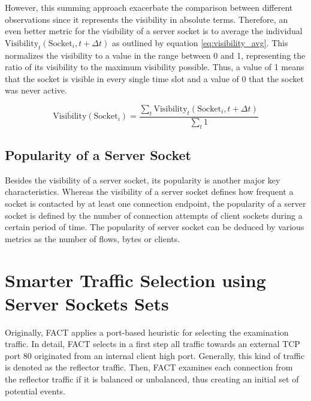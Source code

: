 However, this summing approach exacerbate the comparison between different
observations since it represents the visibility in absolute terms. Therefore, an
even better metric for the visibility of a \gls{server socket} is to average the
individual $\text{Visibility}_t(\text{Socket}_i,t+\Delta{t})$ as outlined by
equation \ref{eq:visibility_avg}. This normalizes the visibility to a value in
the range between 0 and 1, representing the ratio of its visibility to the
maximum visibility possible. Thus, a value of 1 means that the socket is visible
in every single time slot and a value of 0 that the socket was never active.

\begin{equation}
	\overline{\text{Visibility}}(\text{Socket}_i) = \frac{\sum_{t} \text{Visibility}_t(\text{Socket}_i,t+\Delta{t})}{\sum_{t}1}
	\label{eq:visibility_avg}
\end{equation}

\subsection{Popularity of a Server Socket}

Besides the visibility of a \gls{server socket}, its popularity is another major
key characteristics. Whereas the visibility of a \gls{server socket} defines how
frequent a socket is contacted by at least one connection endpoint, the
popularity of a \gls{server socket} is defined by the number of connection
attempts of client sockets during a certain period of time. The popularity of
\gls{server socket} can be deduced by various metrics as the number of flows,
bytes or clients.

\section{Smarter Traffic Selection using Server Sockets Sets 
\label{section:ses_traffic_selection}}

Originally, \gls{FACT} applies a port-based heuristic for selecting the 
examination traffic. 
In detail, \gls{FACT} selects in a first step all traffic towards an external 
\gls{TCP} port 80 originated from an internal client high port. 
Generally, this kind of traffic is denoted as the reflector traffic. 
Then, \gls{FACT} examines each connection from the reflector traffic if it is 
balanced or unbalanced, thus creating an initial set of potential events. 

